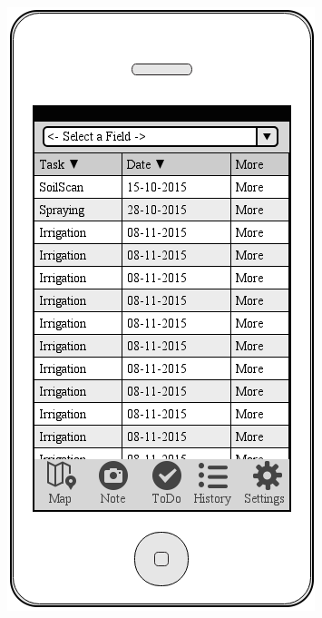 \documentclass[12pt]{article}
\begin{document}
\begin{figure}[ht]
	\includegraphics[width=\linewidth, height=0.4\textheight, keepaspectratio=true]{mockups/ToDo.png}
	\caption{}
	\endminipage\hfill
\end{figure}
\end{document}
